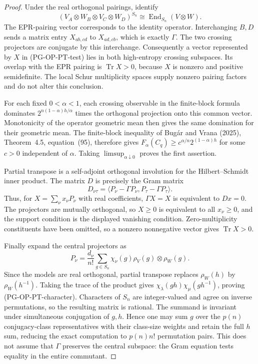 \begin{proof}
Under the real orthogonal pairings, identify
\[
 (V_A\otimes W_B\otimes V_C\otimes W_D)^{S_n}
 \cong\operatorname{End}_{S_n}(V\otimes W).
\]
The EPR-pairing vector corresponds to the identity operator. Interchanging
$B,D$ sends a matrix entry $X_{ab,cd}$ to $X_{ad,cb}$, which is exactly
$\Gamma$. The two crossing projectors are conjugate by this interchange.
Consequently a vector represented by $X$ in (PG-OP-PT-test) lies in both
high-entropy crossing subspaces. Its overlap with the EPR pairing is
$\operatorname{Tr}X>0$, because $X$ is nonzero and positive semidefinite.
The local Schur multiplicity spaces supply nonzero pairing factors and do
not alter this conclusion.

For each fixed $0<\alpha<1$, each crossing observable in the finite-block
formula dominates $2^{n(1-\alpha)h/\alpha}$ times the orthogonal projection
onto this common vector. Monotonicity of the operator geometric mean then
gives the same domination for their geometric mean. The finite-block
inequality of Bug\'ar and Vrana (2025), Theorem~4.5, equation~(95), therefore
gives $F_\alpha(C_q)\geq c^{\alpha/n}2^{(1-\alpha)h}$ for some $c>0$
independent of $\alpha$. Taking $\limsup_{\alpha\downarrow0}$ proves the
first assertion.

Partial transpose is a self-adjoint orthogonal involution for the
Hilbert--Schmidt inner product. The matrix $D$ is precisely the Gram
matrix
\[
 D_{\nu\tau}=\langle P_\nu-\Gamma P_\nu,
                         P_\tau-\Gamma P_\tau\rangle.
\]
Thus, for $X=\sum_\nu x_\nu P_\nu$ with real coefficients,
$\Gamma X=X$ is equivalent to $Dx=0$. The projectors are mutually
orthogonal, so $X\geq0$ is equivalent to all $x_\nu\geq0$, and the support
condition is the displayed vanishing condition. Zero-multiplicity
constituents have been omitted, so a nonzero nonnegative vector gives
$\operatorname{Tr}X>0$.

Finally expand the central projectors as
\[
 P_\nu=\frac{d_\nu}{n!}\sum_{g\in S_n}
 \chi_\nu(g)\rho_V(g)\otimes\rho_W(g).
\]
Since the models are real orthogonal, partial transpose replaces
$\rho_W(h)$ by $\rho_W(h^{-1})$. Taking the trace of the product gives
$\chi_\lambda(gh)\chi_\mu(gh^{-1})$, proving
(PG-OP-PT-character). Characters of $S_n$ are integer-valued and agree on
inverse permutations, so the resulting matrix is rational. The summand is
invariant under simultaneous conjugation of $g,h$. Hence one may sum $g$
over the $p(n)$ conjugacy-class representatives with their class-size
weights and retain the full $h$ sum, reducing the exact computation to
$p(n)n!$ permutation pairs. This does not assume that $\Gamma$ preserves
the central subspace: the Gram equation tests equality in the entire
commutant.
\end{proof}



